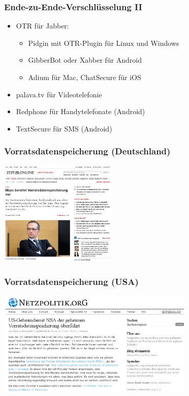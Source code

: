 \documentclass[12pt]{beamer}
\begin{document}
\begin{frame}
  \frametitle{Ende-zu-Ende-Verschlüsselung II}
  \begin{itemize}
    \item<3-> OTR für Jabber:
      \begin{itemize}
        \item Pidgin mit OTR-Plugin für Linux und Windows
        \item GibberBot oder Xabber für Android
        \item Adium für Mac, ChatSecure für iOS
      \end{itemize}
    \item<4-> palava.tv für Videotelefonie
    \item<5-> Redphone für Handytelefonate (Android)
    \item<6-> TextSecure für SMS (Android)
  \end{itemize}
\end{frame}

\begin{frame}
  \frametitle{Vorratsdatenspeicherung (Deutschland)}
    \begin{center}
      \includegraphics[height=5cm]{img/zeit-vds.png}
    \end{center}
\end{frame}

\begin{frame}
  \frametitle{Vorratsdatenspeicherung (USA)}
    \begin{center}
      \includegraphics[height=5cm]{img/netzpolitik-verizon.png}
    \end{center}
\end{frame}
\end{document}
